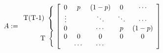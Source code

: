 \documentclass[12pt]{article}
\begin{document}
\begin{enumerate}
  \[
    A := 
    \begin{array}{r@{}}
      \text{T(T-1)}~\left\{\begin{array}{@{}c@{}}\null\\\null\\\null\end{array}\right.\\
      \text{T}~\left\{\begin{array}{@{}c@{}}\null\\\null\end{array}\right.\\
    \end{array}
  \left [
    \begin{array}{ccccc}
      0               & p                     & (1-p)  & 0     & \cdots \\
      \vdots          &                       & \ddots & \ddots& \cdots \\
      0               &                       & \cdots & p     & (1-p)  \\
      0               & 0                     & 0      & 0     & 0      \\
                      & \cdots                & \cdots &       & 
    \end{array}
  \right ]
\]



\end{enumerate}
\end{document}
